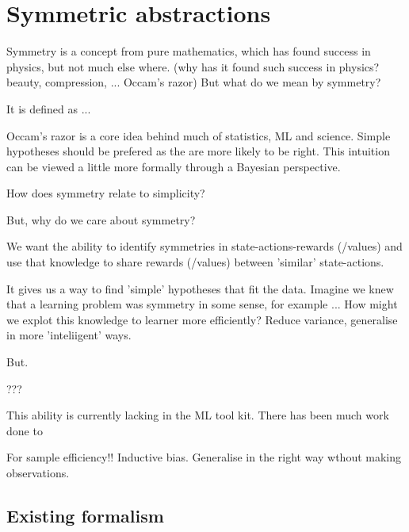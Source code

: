 \newpage
\section{Symmetric abstractions}\label{symmstric-abstractions}



Symmetry is a concept from pure mathematics, which has found success in physics,
but not much else where. (why has it found such success in physics? beauty, compression, ... Occam's razor)
But what do we mean by symmetry?


It is defined as ...

Occam's razor is a core idea behind much of statistics, ML and science. Simple
hypotheses should be prefered as the are more likely to be right. This intuition
can be viewed a little more formally through a Bayesian perspective.

How does symmetry relate to simplicity?

But, why do we care about symmetry?
\begin{displayquote}
We want the ability to identify symmetries in state-actions-rewards (/values) and use that knowledge to share rewards (/values) between 'similar' state-actions.
\end{displayquote}
It gives us a way to find 'simple' hypotheses that fit the data.
Imagine we knew that a learning problem was symmetry in some sense, for example ...
How might we explot this knowledge to learner more efficiently?
Reduce variance, generalise in more 'inteliigent' ways.

But.

???

This ability is currently lacking in the ML tool kit. There has been much work done
to

For sample efficiency!! Inductive bias. Generalise in the right way wthout making observations.

\subsection{Existing formalism}

